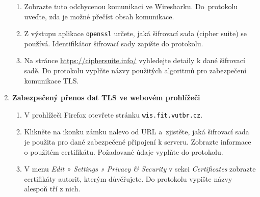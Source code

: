 \documentclass[a4paper,11pt]{article}
\begin{document}
\begin{enumerate}
\begin{enumerate}
      \item Zobrazte tuto odchycenou komunikaci ve Wiresharku.  Do~protokolu uveďte, zda je možné přečíst obsah komunikace. 

      \item Z výstupu aplikace \texttt{openssl} určete, jaká šifrovací sada (cipher suite) se používá. Identifikátor šifrovací sady zapište do protokolu.

      \item Na stránce \url{https://ciphersuite.info/} vyhledejte detaily k dané šifrovací sadě. Do protokolu vyplňte názvy použitých algoritmů pro zabezpečení komunikace TLS.
    \end{enumerate}

  \item {\bf Zabezpečený přenos dat TLS ve webovém prohlížeči}

    \begin{enumerate}
      \item V prohlížeči Firefox otevřete stránku  \verb|wis.fit.vutbr.cz|.
      \item Klikněte na ikonku zámku nalevo od URL a~zjistěte, jaká šifrovací sada je použita pro dané zabezpečené připojení k serveru. Zobrazte informace o použitém certifikátu.
      Požadované údaje vyplňte do protokolu.
      \item V menu \emph{Edit » Settings » Privacy \& Security} v sekci
        \emph{Certificates} zobrazte certifikáty autorit, kterým důvěřujete. Do protokolu vypište názvy alespoň tří z nich.
    \end{enumerate}

\end{enumerate}
\end{document}

